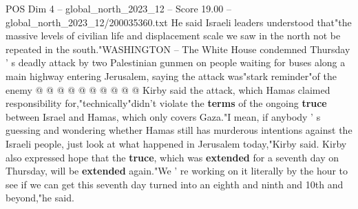 \begin{textsample}{POS Dim 4 – global\_north\_2023\_12 – Score 19.00 – global\_north\_2023\_12/200035360.txt}
He said Israeli leaders understood that"the massive levels of civilian life and displacement scale we saw in the north not be repeated in the south."WASHINGTON -- The White House condemned Thursday ' s deadly attack by two Palestinian gunmen on people waiting for buses along a main highway entering Jerusalem, saying the attack was"stark reminder"of the enemy @ @ @ @ @ @ @ @ @ @ Kirby said the attack, which Hamas claimed responsibility for,"technically"didn't violate the \textbf{terms} of the ongoing \textbf{truce} between Israel and Hamas, which only covers Gaza."I mean, if anybody ' s guessing and wondering whether Hamas still has murderous intentions against the Israeli people, just look at what happened in Jerusalem today,"Kirby said.
Kirby also expressed hope that the \textbf{truce}, which was \textbf{extended} for a seventh day on Thursday, will be \textbf{extended} again."We ' re working on it literally by the hour to see if we can get this seventh day turned into an eighth and ninth and 10th and beyond,"he said.

\end{textsample}
